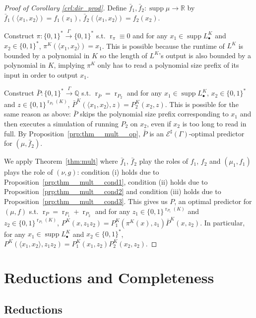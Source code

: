 \documentclass{article}
\numberwithin{equation}{section}
\theoremstyle{definition}
\theoremstyle{plain}
\newcommand{\Bool}{\{0,1\}}
\newcommand{\Words}{{\Bool^*}}
\DeclareMathOperator{\Supp}{supp}
\DeclareMathOperator{\R}{r}
\newcommand{\Rats}{\mathbb{Q}}
\newcommand{\Reals}{\mathbb{R}}
\newcommand{\Chev}[1]{\langle #1 \rangle}
\newcommand{\Fall}{\mathcal{E}}
\newcommand{\ESG}{\Fall^\sharp(\Gamma)}
\newcommand{\Scheme}{\xrightarrow{\Gamma}}
\begin{document}
\begin{proof}[Proof of Corollary \ref{crl:dir_prod}]

Define $\bar{f}_1, \bar{f}_2: \Supp \mu \rightarrow \Reals$ by $\bar{f}_1(\Chev{x_1,x_2})=f_1(x_1)$, $\bar{f}_2(\Chev{x_1,x_2})=f_2(x_2)$. 

Construct $\pi: \Words \Scheme \Words$ s.t. $\R_\pi \equiv 0$ and for any ${x_1 \in \Supp L_\bullet^K}$ and $x_2 \in \Words$, $\pi^K(\Chev{x_1,x_2})=x_1$. This is possible because the runtime of $L^K$ is bounded by a polynomial in $K$ so the length of $L^K$'s output is also bounded by a polynomial in $K$, implying $\pi^K$ only has to read a polynomial size prefix of its input in order to output $x_1$.

Construct $\bar{P}: \Words \Scheme \Rats$ s.t. $\R_{\bar{P}}=\R_{P_2}$ and for any $x_1 \in \Supp L_\bullet^K$, $x_2 \in \Words$ and $z \in \Bool^{\R_{P_2}(K)}$, $\bar{P}^K(\Chev{x_1,x_2},z)=P_2^K(x_2,z)$. This is possible for the same reason as above: $\bar{P}$ skips the polynomial size prefix corresponding to $x_1$ and then executes a simulation of running $P_2$ on $x_2$, even if $x_2$ is too long to read in full. By Proposition~\ref{prp:thm__mult__op}, $\bar{P}$ is an $\ESG$-optimal predictor for $(\mu,\bar{f}_2)$. 

We apply Theorem~\ref{thm:mult} where $\bar{f}_1$, $\bar{f}_2$ play the roles of $f_1$, $f_2$ and $(\mu_1, f_1)$ plays the role of $(\nu,g)$: condition (i) holds due to Proposition~\ref{prp:thm__mult__cond1}, condition (ii) holds due to Proposition~\ref{prp:thm__mult__cond2} and condition (iii) holds due to Proposition~\ref{prp:thm__mult__cond3}. This gives us $P$, an optimal predictor for $(\mu, f)$ s.t. $\R_P=\R_{P_1}+\R_{P_2}$ and for any ${z_1 \in \Bool^{\R_{P_1}(K)}}$ and $z_2 \in \Bool^{\R_{P_1}(K)}$, $P^K(x, z_1 z_2) = P_1^K(\pi^K(x),z_1) \bar{P}^K(x,z_2)$. In particular, for any ${x_1 \in \Supp L_\bullet^K}$ and $x_2 \in \Words$, ${P^K(\Chev{x_1,x_2}, z_1 z_2)=P_1^K(x_1,z_2)P_2^K(x_2,z_2)}$.
%
\end{proof}

\section{Reductions and Completeness}
\label{sec:reductions}

\subsection{Reductions}
\end{document}
